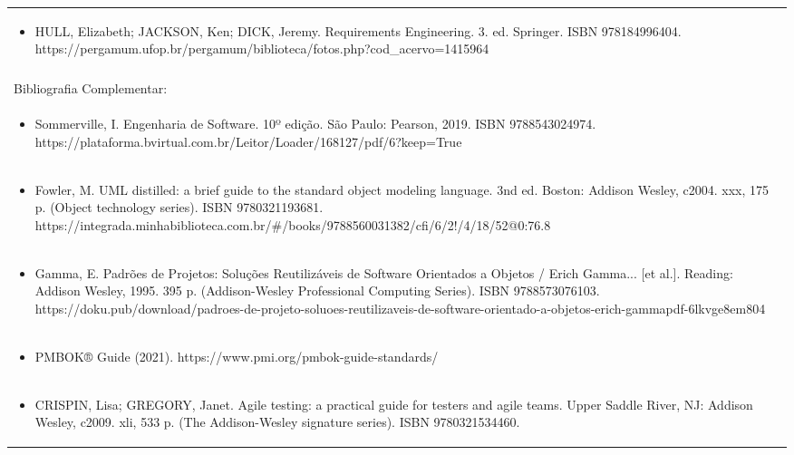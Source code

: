 \documentclass[11pt]{article}
\begin{document}
\begin{center}
\begin{longtable}{|p{4cm}|p{4cm}|p{4cm}|p{4cm}|}
\multicolumn{4}{|p{\dimexpr 16cm + 6\tabcolsep\relax}|}{\begin{itemize}\item HULL, Elizabeth; JACKSON, Ken; DICK, Jeremy. Requirements Engineering. 3. ed. Springer. ISBN 978184996404. https://pergamum.ufop.br/pergamum/biblioteca/fotos.php?cod\_acervo=1415964\end{itemize}}\\
\multicolumn{4}{|p{16cm}|}{}\\
\hline
\multicolumn{4}{|p{16cm}|}{Bibliografia Complementar:}\\*
\multicolumn{4}{|p{\dimexpr 16cm + 6\tabcolsep\relax}|}{\begin{itemize}\item Sommerville, I. Engenharia de Software. 10º edição. São Paulo: Pearson, 2019. ISBN 9788543024974. https://plataforma.bvirtual.com.br/Leitor/Loader/168127/pdf/6?keep=True\end{itemize}}\\
\multicolumn{4}{|p{\dimexpr 16cm + 6\tabcolsep\relax}|}{\begin{itemize}\item Fowler, M. UML distilled: a brief guide to the standard object modeling language. 3nd ed. Boston: Addison Wesley, c2004. xxx, 175 p. (Object technology series). ISBN 9780321193681. https://integrada.minhabiblioteca.com.br/\#/books/9788560031382/cfi/6/2!/4/18/52@0:76.8\end{itemize}}\\
\multicolumn{4}{|p{\dimexpr 16cm + 6\tabcolsep\relax}|}{\begin{itemize}\item Gamma, E. Padrões de Projetos: Soluções Reutilizáveis de Software Orientados a Objetos / Erich Gamma... [et al.]. Reading: Addison Wesley, 1995. 395 p. (Addison-Wesley Professional Computing Series). ISBN 9788573076103. https://doku.pub/download/padroes-de-projeto-soluoes-reutilizaveis-de-software-orientado-a-objetos-erich-gammapdf-6lkvge8em804\end{itemize}}\\
\multicolumn{4}{|p{\dimexpr 16cm + 6\tabcolsep\relax}|}{\begin{itemize}\item PMBOK® Guide (2021). https://www.pmi.org/pmbok-guide-standards/\end{itemize}}\\
\multicolumn{4}{|p{\dimexpr 16cm + 6\tabcolsep\relax}|}{\begin{itemize}\item CRISPIN, Lisa; GREGORY, Janet. Agile testing: a practical guide for testers and agile teams. Upper Saddle River, NJ: Addison Wesley, c2009. xli, 533 p. (The Addison-Wesley signature series). ISBN 9780321534460.\end{itemize}}\\
\hline
\end{longtable}
\end{center}
\end{document}
